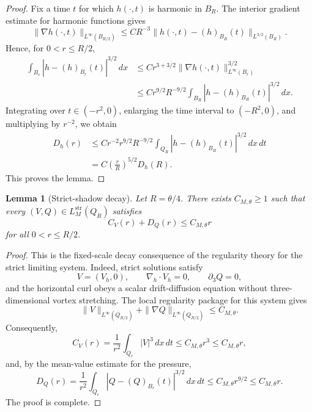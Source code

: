 \documentclass[11pt]{article}
\numberwithin{equation}{section}
\theoremstyle{plain}
\newtheorem{lemma}{Lemma}[section]
\theoremstyle{definition}
\theoremstyle{remark}
\newcommand{\str}{\mathrm{str}}
\newcommand{\dx}{\,dx}
\newcommand{\dxdt}{\,dx\,dt}
\begin{document}
\begin{proof}
Fix a time $t$ for which $h(\cdot,t)$ is harmonic in $B_R$.  The interior gradient estimate for harmonic functions gives
\[
        \|\nabla h(\cdot,t)\|_{L^\infty(B_{R/2})}
        \le
        C R^{-3}
        \|h(\cdot,t)-(h)_{B_R}(t)\|_{L^{3/2}(B_R)} .
\]
Hence, for $0<r\le R/2$,
\[
\begin{aligned}
        \int_{B_r}
        |h-(h)_{B_r}(t)|^{3/2}\dx
        &\le
        C r^{3+3/2}
        \|\nabla h(\cdot,t)\|_{L^\infty(B_r)}^{3/2}    \\
        &\le
        C r^{9/2}R^{-9/2}
        \int_{B_R}|h-(h)_{B_R}(t)|^{3/2}\dx .
\end{aligned}
\]
Integrating over $t\in(-r^2,0)$, enlarging the time interval to $(-R^2,0)$, and multiplying by $r^{-2}$, we obtain
\[
\begin{aligned}
        D_h(r)
        &\le
        C r^{-2}r^{9/2}R^{-9/2}
        \int_{Q_R}|h-(h)_{B_R}(t)|^{3/2}\dxdt        \\
        &=
        C\left(\frac{r}{R}\right)^{5/2}
        D_h(R).
\end{aligned}
\]
This proves the lemma.
\end{proof}

\begin{lemma}[Strict-shadow decay]
\label{pII:lem:strict-shadow-decay}
Let $R=\theta/4$.  There exists $C_{M,\theta}\ge1$ such that every $(V,Q)\in L_M^{\str}(Q_R)$ satisfies
\[
        C_V(r)+D_Q(r)
        \le
        C_{M,\theta}r
\]
for all $0<r\le R/2$.
\end{lemma}

\begin{proof}
This is the fixed-scale decay consequence of the regularity theory for the strict limiting system.  Indeed, strict solutions satisfy
\[
        V=(V_h,0),\qquad
        \nabla_h\cdot V_h=0,\qquad
        \partial_3Q=0,
\]
and the horizontal curl obeys a scalar drift-diffusion equation without three-dimensional vortex stretching.  The local regularity package for this system gives
\[
        \|V\|_{L^\infty(Q_{R/2})}
        +
        \|\nabla Q\|_{L^\infty(Q_{R/2})}
        \le
        C_{M,\theta}.
\]
Consequently,
\[
        C_V(r)
        =
        \frac1{r^2}\int_{Q_r}|V|^3\dxdt
        \le
        C_{M,\theta} r^3
        \le
        C_{M,\theta}r,
\]
and, by the mean-value estimate for the pressure,
\[
        D_Q(r)
        =
        \frac1{r^2}
        \int_{Q_r}|Q-(Q)_{B_r}(t)|^{3/2}\dxdt
        \le
        C_{M,\theta} r^{9/2}
        \le
        C_{M,\theta}r.
\]
The proof is complete.
\end{proof}
\end{document}
